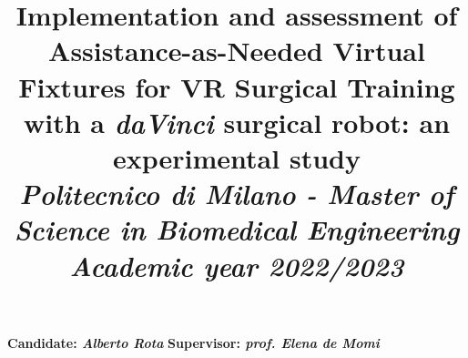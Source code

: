 \documentclass{article}
\title{\textbf{Implementation and assessment of Assistance-as-Needed Virtual Fixtures for VR Surgical Training with a \textit{daVinci} surgical robot: an experimental study}
\\
\vspace{0.5cm}\large{\textit{Politecnico di Milano - Master of Science in Biomedical Engineering}}
\\
\vspace{0.5cm}\textit{\small{Academic year 2022/2023}}}
\author{}
\date{}
\begin{document}
\maketitle
{\large\noindent \textbf{Candidate: \textit{Alberto Rota}}\newline
\textbf{Supervisor: \textit{prof. Elena de Momi}}}
\vspace{1cm}




% 
% 
\end{document}

